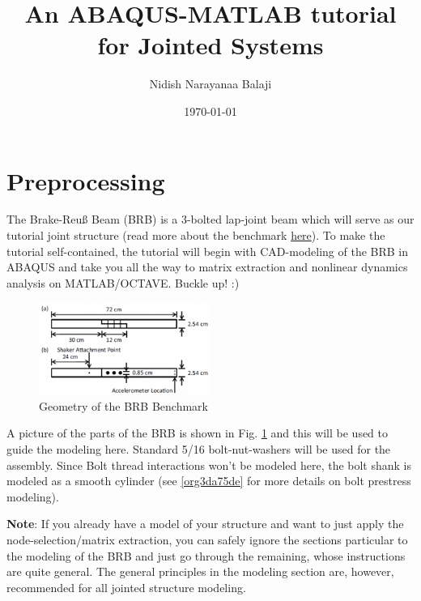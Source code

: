 \documentclass[11pt]{article}
\author{Nidish Narayanaa Balaji}
\date{\today}
\title{An ABAQUS-MATLAB tutorial for Jointed Systems}
\begin{document}
\maketitle
\tableofcontents

\pagebreak

\section{Preprocessing}
\label{sec:org3da833d}

The Brake-Reuß Beam (BRB) is a 3-bolted lap-joint beam which will serve as our tutorial joint structure (read more about the benchmark \href{https://jointmechanics.org/index.php/Benchmarks\#The\_Brake-Reu\%C3\%9F\_Beams}{here}).
To make the tutorial self-contained, the tutorial will begin with CAD-modeling of the BRB in ABAQUS and take you all the way to matrix extraction and nonlinear dynamics analysis on MATLAB/OCTAVE.
Buckle up! :)

\begin{figure}[htbp]
\centering
\includegraphics[width=0.5\textwidth]{./figs/300px-BRB.png}
\caption{\label{fig:org5494497}Geometry of the BRB Benchmark}
\end{figure}

A picture of the parts of the BRB is shown in Fig. \ref{fig:org5494497} and this will be used to guide the modeling here.
Standard 5/16 bolt-nut-washers will be used for the assembly. Since Bolt thread interactions won't be modeled here, the bolt shank is modeled as a smooth cylinder (see \ref{org3da75de} for more details on bolt prestress modeling).

\textbf{Note}: If you already have a model of your structure and want to just apply the node-selection/matrix extraction, you can safely ignore the sections particular to the modeling of the BRB and just go through the remaining, whose instructions are quite general.
The general principles in the modeling section are, however, recommended for all jointed structure modeling.
\end{document}
